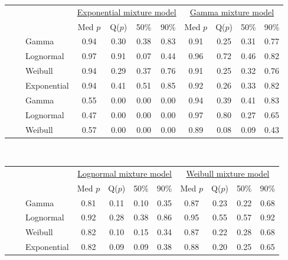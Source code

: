 \documentclass[useAMS,usenatbib,referee,12pt]{article}
\begin{document}
\begin{table}[ht]
\begin{tabular}{l|l|l|cccc|cccc}
 \multicolumn{3}{c}{ } & \multicolumn{4}{c}{\underline{Exponential mixture model}} & \multicolumn{4}{c}{\underline{Gamma mixture model}} \\
 \multicolumn{3}{c}{ } & Med $p$ & Q($p$) & 50\% & 90\%  & Med $p$ & Q($p$) & 50\% & 90\% \\ 
  \hline
\parbox[t]{2mm}{} & \parbox[t]{2mm}{} & Gamma & 0.94 & 0.30 & 0.38 & 0.83 & 0.91 & 0.25 & 0.31 & 0.77 \\ 
   &  & Lognormal & 0.97 & 0.91 & 0.07 & 0.44 & 0.96 & 0.72 & 0.46 & 0.82 \\ 
   &  & Weibull & 0.94 & 0.29 & 0.37 & 0.76 & 0.91 & 0.25 & 0.32 & 0.76 \\ 
   &  & Exponential & 0.94 & 0.41 & 0.51 & 0.85 & 0.92 & 0.26 & 0.33 & 0.82 \\ 
& \parbox[t]{2mm}{} & Gamma & 0.55 & 0.00 & 0.00 & 0.00 & 0.94 & 0.39 & 0.41 & 0.83 \\ 
   &  & Lognormal & 0.47 & 0.00 & 0.00 & 0.00 & 0.97 & 0.80 & 0.27 & 0.65 \\ 
   &  & Weibull & 0.57 & 0.00 & 0.00 & 0.00 & 0.89 & 0.08 & 0.09 & 0.43 \\ 
   \hline
\end{tabular}
\vspace{0.5cm}\\
\begin{tabular}{l|l|l|cccc|cccc}
 \multicolumn{3}{c}{ } & \multicolumn{4}{c}{\underline{Lognormal mixture model}} & \multicolumn{4}{c}{\underline{Weibull mixture model}} \\
 \multicolumn{3}{c}{ } & Med $p$ & Q($p$) & 50\% & 90\% & Med $p$ & Q($p$) & 50\% & 90\% \\ 
  \hline
\parbox[t]{2mm}{} & \parbox[t]{2mm}{} & Gamma & 0.81 & 0.11 & 0.10 & 0.35 & 0.87 & 0.23 & 0.22 & 0.68 \\ 
   &  & Lognormal & 0.92 & 0.28 & 0.38 & 0.86 & 0.95 & 0.55 & 0.57 & 0.92 \\ 
   &  & Weibull & 0.82 & 0.10 & 0.15 & 0.34 & 0.87 & 0.22 & 0.28 & 0.68 \\ 
   &  & Exponential & 0.82 & 0.09 & 0.09 & 0.38 & 0.88 & 0.20 & 0.25 & 0.65 \\ 

\end{tabular}
\end{table}
\end{document}
